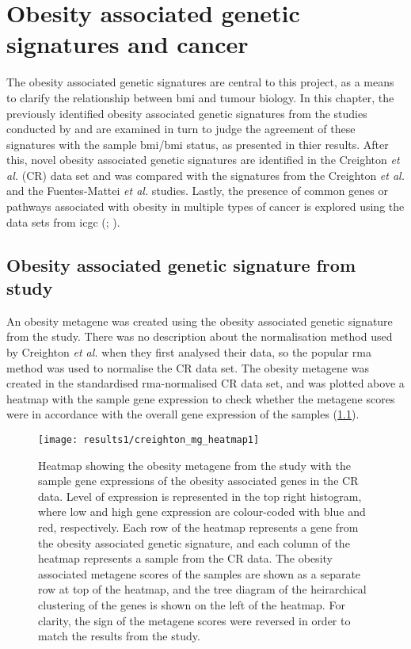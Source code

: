 \chapter{Obesity associated genetic signatures and cancer}
\label{cha:obesity_genetic_signatures_and_cancer}

The obesity associated genetic signatures are central to this project, as a means to clarify the relationship between \gls{bmi} and tumour biology.
In this chapter, the previously identified obesity associated genetic signatures from the studies conducted by \citet{Creighton2012} and \citet{Fuentes-Mattei2014} are examined in turn to judge the agreement of these signatures with the sample \gls{bmi}/\gls{bmi} status, as presented in thier results.
After this, novel obesity associated genetic signatures are identified in the Creighton \textit{et al.} (CR) data set and was compared with the signatures from the Creighton \textit{et al.} and the Fuentes-Mattei \textit{et al.} studies.
Lastly, the presence of common genes or pathways associated with obesity in multiple types of cancer is explored using the data sets from \gls{icgc} (; \citealp{Zhang2011}).

\section{Obesity associated genetic signature from \citet{Creighton2012} study}
\label{sec:creighton_obesity_metagene}

An obesity metagene was created using the obesity associated genetic signature from the \citet{Creighton2012} study.
There was no description about the normalisation method used by Creighton \textit{et al.} when they first analysed their data, so the popular \gls{rma} method \citep{Irizarry2003} was used to  normalise the CR data set.
The obesity metagene was created in the standardised \gls{rma}-normalised CR data set, and  was plotted above a heatmap with the sample gene expression  to check whether the metagene scores were in accordance with the overall gene expression of the samples (\cref{fig:crmetaheat}).

\begin{figure}[htb]
	\centering
	\texttt{[image: results1/creighton\_mg\_heatmap1]}
	\caption[Obesity metagene from \citet{Creighton2012} study and sample gene expression in CR data] {Heatmap showing the obesity metagene from the \citet{Creighton2012} study with the sample gene expressions of the obesity associated genes in the CR data.
	Level of expression is represented in the top right histogram, where low and high gene expression are colour-coded with blue and red, respectively.
	Each row of the heatmap represents a gene from the obesity associated genetic signature, and each column of the heatmap represents a sample from the CR data.
	The obesity associated metagene scores of the samples are shown as a separate row at top of the heatmap, and the tree diagram of the heirarchical clustering of the genes is shown on the left of the heatmap.
	For clarity, the sign of the metagene scores were reversed in order to match the results from the \citet{Creighton2012} study.}
	\label{fig:crmetaheat}
\end{figure}

